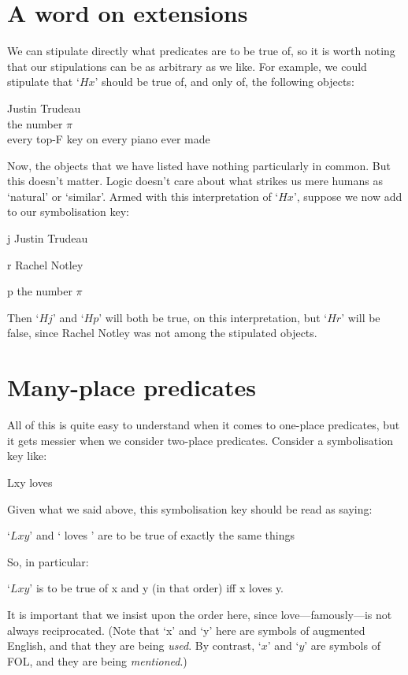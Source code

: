 \section{A word on extensions}
We can stipulate directly what predicates are to be true of, so it is worth noting that our stipulations can be as arbitrary as we like. For example, we could stipulate that `$Hx$' should be true of, and only of, the following objects:
	\begin{center}
		Justin Trudeau\\
		the number $\pi$\\
		every top-F key on every piano ever made
	\end{center}
Now, the objects that we have listed have nothing particularly in common. But this doesn't matter. Logic doesn't care about what strikes us mere humans as `natural' or `similar'. Armed with this interpretation of `$Hx$', suppose we now add to our symbolisation key:
	\begin{ekey}
		\item[j] Justin Trudeau
		\item[r] Rachel Notley
		\item[p] the number $\pi$
	\end{ekey}
Then `$Hj$' and `$Hp$' will both be true, on this interpretation, but `$Hr$' will be false, since Rachel Notley was not among the stipulated objects. 



\section{Many-place predicates}
All of this is quite easy to understand when it comes to one-place predicates, but it gets messier when we consider two-place predicates. Consider a symbolisation key like:
	\begin{ekey}
		\item[Lxy]  loves 
	\end{ekey}
Given what we said above, this symbolisation key should be read as saying:
	\begin{earg}
		\item[\textbullet] `$Lxy$' and ` loves ' are to be true of exactly the same things
	\end{earg}
So, in particular:
	\begin{earg}
		\item[\textbullet] `$Lxy$' is to be true of x and y (in that order) iff x loves y. 
	\end{earg}
It is important that we insist upon the order here, since love---famously---is not always reciprocated. (Note that `x' and `y' here are symbols of augmented English, and that they are being \emph{used}. By contrast, `$x$' and `$y$' are symbols of FOL, and they are being \emph{mentioned}.)

